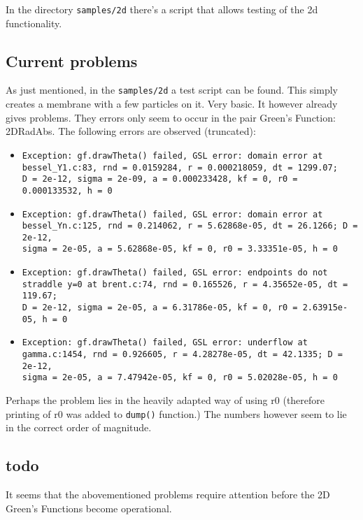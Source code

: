 \documentclass[a4paper,10pt]{article}
\begin{document}
In the directory \verb|samples/2d| there's a script that allows testing of the 2d functionality.

\subsection{Current problems}

As just mentioned, in the \verb|samples/2d| a test script can be found. This simply creates a membrane with a few particles on it. Very basic. It however already gives problems. They errors only seem to occur in the pair Green's Function: 2DRadAbs. 
  The following errors are observed (truncated):

\begin{itemize}
 \item \begin{verbatim}
Exception: gf.drawTheta() failed, GSL error: domain error at 
bessel_Y1.c:83, rnd = 0.0159284, r = 0.000218059, dt = 1299.07; 
D = 2e-12, sigma = 2e-09, a = 0.000233428, kf = 0, r0 = 0.000133532, h = 0
\end{verbatim}
 \item \begin{verbatim}
Exception: gf.drawTheta() failed, GSL error: domain error at 
bessel_Yn.c:125, rnd = 0.214062, r = 5.62868e-05, dt = 26.1266; D = 2e-12, 
sigma = 2e-05, a = 5.62868e-05, kf = 0, r0 = 3.33351e-05, h = 0
\end{verbatim}
 \item \begin{verbatim}
Exception: gf.drawTheta() failed, GSL error: endpoints do not 
straddle y=0 at brent.c:74, rnd = 0.165526, r = 4.35652e-05, dt = 119.67; 
D = 2e-12, sigma = 2e-05, a = 6.31786e-05, kf = 0, r0 = 2.63915e-05, h = 0
\end{verbatim}
 \item \begin{verbatim}Exception: gf.drawTheta() failed, GSL error: underflow at 
gamma.c:1454, rnd = 0.926605, r = 4.28278e-05, dt = 42.1335; D = 2e-12, 
sigma = 2e-05, a = 7.47942e-05, kf = 0, r0 = 5.02028e-05, h = 0
\end{verbatim}
\end{itemize}

Perhaps the problem lies in the heavily adapted way of using r0 (therefore printing of r0 was added to \verb|dump()| function.) The numbers however seem to lie in the correct order of magnitude.

\subsection{todo}

It seems that the abovementioned problems require attention before the 2D Green's Functions become operational.  
\end{document}
